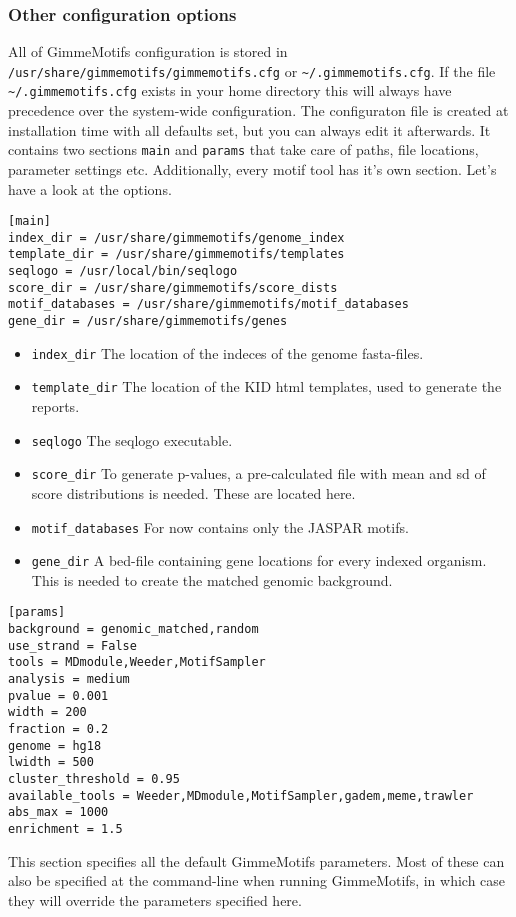 \documentclass[10pt]{article}
\begin{document}
\subsubsection{Other configuration options}
All of GimmeMotifs configuration is stored in \texttt{/usr/share/gimmemotifs/gimmemotifs.cfg} or \texttt{\textasciitilde{}/.gimmemotifs.cfg}. If the file \texttt{\textasciitilde{}/.gimmemotifs.cfg} exists in your home directory this will always have precedence over the system-wide configuration.
The configuraton file is created at installation time with all defaults set, but you can always edit it afterwards. It contains two sections \texttt{main} and \texttt{params} that take care of paths, file locations, parameter settings etc. Additionally, every motif tool has it's own section.
Let's have a look at the options.
\begin{verbatim}
[main]
index_dir = /usr/share/gimmemotifs/genome_index
template_dir = /usr/share/gimmemotifs/templates
seqlogo = /usr/local/bin/seqlogo
score_dir = /usr/share/gimmemotifs/score_dists
motif_databases = /usr/share/gimmemotifs/motif_databases
gene_dir = /usr/share/gimmemotifs/genes
\end{verbatim}
\begin{itemize}
 \item \texttt{index\_dir} The location of the indeces of the genome fasta-files.
 \item \texttt{template\_dir} The location of the KID html templates, used to generate the reports.
 \item \texttt{seqlogo} The seqlogo executable.
 \item \texttt{score\_dir} To generate p-values, a pre-calculated file with mean and sd of score distributions is needed. These are located here.
 \item \texttt{motif\_databases} For now contains only the JASPAR motifs.
 \item \texttt{gene\_dir} A bed-file containing gene locations for every indexed organism. This is needed to create the matched genomic background.
\end{itemize}

\begin{verbatim}
[params]
background = genomic_matched,random
use_strand = False
tools = MDmodule,Weeder,MotifSampler
analysis = medium
pvalue = 0.001
width = 200
fraction = 0.2
genome = hg18
lwidth = 500
cluster_threshold = 0.95
available_tools = Weeder,MDmodule,MotifSampler,gadem,meme,trawler
abs_max = 1000
enrichment = 1.5
\end{verbatim}
This section specifies all the default GimmeMotifs parameters. Most of these can also be specified at the command-line when running GimmeMotifs, in which case they will override the parameters specified here.
\end{document}
